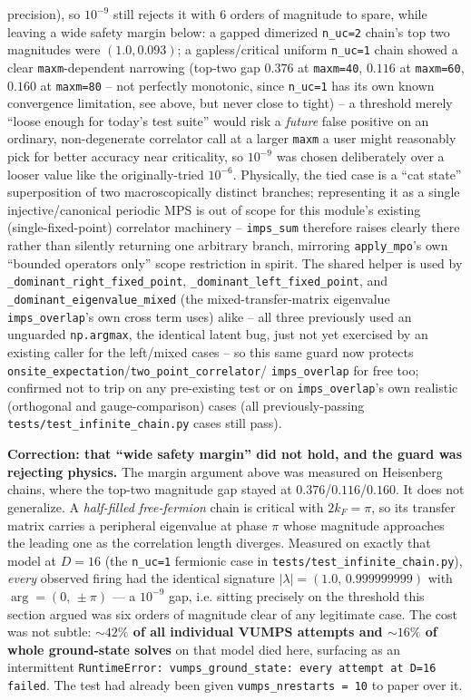 \documentclass[11pt]{article}
\begin{document}
precision), so $10^{-9}$ still rejects it with 6 orders of magnitude to
spare, while leaving a wide safety margin below: a gapped dimerized
\texttt{n\_uc=2} chain's top two magnitudes were $(1.0, 0.093)$; a
gapless/critical uniform \texttt{n\_uc=1} chain showed a clear
\texttt{maxm}-dependent narrowing (top-two gap $0.376$ at
\texttt{maxm=40}, $0.116$ at \texttt{maxm=60}, $0.160$ at
\texttt{maxm=80} -- not perfectly monotonic, since \texttt{n\_uc=1} has
its own known convergence limitation, see above, but never close to
tight) -- a threshold merely ``loose enough for today's test suite''
would risk a \emph{future} false positive on an ordinary, non-degenerate
correlator call at a larger \texttt{maxm} a user might reasonably pick
for better accuracy near criticality, so $10^{-9}$ was chosen
deliberately over a looser value like the originally-tried $10^{-6}$.
Physically, the tied case is a ``cat state'' superposition of two
macroscopically distinct branches; representing it as a single
injective/canonical periodic MPS is out of scope for this module's
existing (single-fixed-point) correlator machinery -- \texttt{imps\_sum}
therefore raises clearly there rather than silently returning one
arbitrary branch, mirroring \texttt{apply\_mpo}'s own ``bounded operators
only'' scope restriction in spirit. The shared helper is used by
\texttt{\_dominant\_right\_fixed\_point}, \texttt{\_dominant\_left\_fixed\_point},
and \texttt{\_dominant\_eigenvalue\_mixed} (the mixed-transfer-matrix
eigenvalue \texttt{imps\_overlap}'s own cross term uses) alike -- all
three previously used an unguarded \texttt{np.argmax}, the identical
latent bug, just not yet exercised by an existing caller for the
left/mixed cases -- so this same guard now protects
\texttt{onsite\_expectation}/\texttt{two\_point\_correlator}/
\texttt{imps\_overlap} for free too; confirmed not to trip on any
pre-existing test or on \texttt{imps\_overlap}'s own realistic (orthogonal
and gauge-comparison) cases (all previously-passing
\texttt{tests/test\_infinite\_chain.py} cases still pass).

\textbf{Correction: that ``wide safety margin'' did not hold, and the
guard was rejecting physics.} The margin argument above was measured on
Heisenberg chains, where the top-two magnitude gap stayed at
$0.376$/$0.116$/$0.160$. It does not generalize. A \emph{half-filled
free-fermion} chain is critical with $2k_F=\pi$, so its transfer matrix
carries a peripheral eigenvalue at phase $\pi$ whose magnitude approaches
the leading one as the correlation length diverges. Measured on exactly
that model at $D=16$ (the \texttt{n\_uc=1} fermionic case in
\texttt{tests/test\_infinite\_chain.py}), \emph{every} observed firing had
the identical signature $|\lambda| = (1.0,\, 0.999999999)$ with
$\arg = (0,\, \pm\pi)$ --- a $10^{-9}$ gap, i.e. sitting precisely on the
threshold this section argued was six orders of magnitude clear of any
legitimate case. The cost was not subtle: \textbf{${\sim}42\%$ of all
individual VUMPS attempts and ${\sim}16\%$ of whole ground-state solves}
on that model died here, surfacing as an intermittent
\texttt{RuntimeError: vumps\_ground\_state: every attempt at D=16 failed}.
The test had already been given \texttt{vumps\_nrestarts = 10} to paper
over it.
\end{document}
